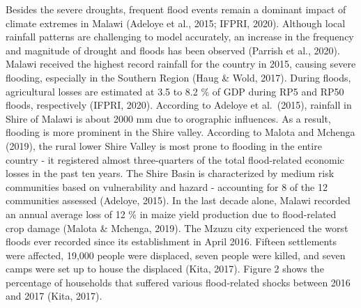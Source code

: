 \documentclass[
]{book}
\begin{document}
Besides the severe droughts, frequent flood events remain a dominant impact of climate extremes in Malawi (Adeloye et al., 2015; IFPRI, 2020). Although local
rainfall patterns are challenging to model accurately, an increase in the frequency and magnitude of drought and floods has been observed (Parrish et al., 2020).
Malawi received the highest record rainfall for the country in 2015, causing severe flooding, especially in the Southern Region (Haug \& Wold, 2017). During
floods, agricultural losses are estimated at 3.5 to 8.2 \% of GDP during RP5 and RP50 floods, respectively (IFPRI, 2020). According to Adeloye et al.~(2015),
rainfall in Shire of Malawi is about 2000 mm due to orographic influences. As a result, flooding is more prominent in the Shire valley. According to Malota and
Mchenga (2019), the rural lower Shire Valley is most prone to flooding in the entire country - it registered almost three-quarters of the total flood-related
economic losses in the past ten years. The Shire Basin is characterized by medium risk communities based on vulnerability and hazard - accounting for 8 of the 12
communities assessed (Adeloye, 2015). In the last decade alone, Malawi recorded an annual average loss of 12 \% in maize yield production due to flood-related
crop damage (Malota \& Mchenga, 2019). The Mzuzu city experienced the worst floods ever recorded since its establishment in April 2016. Fifteen settlements were
affected, 19,000 people were displaced, seven people were killed, and seven camps were set up to house the displaced (Kita, 2017). Figure 2 shows the percentage
of households that suffered various flood-related shocks between 2016 and 2017 (Kita, 2017).
\end{document}
